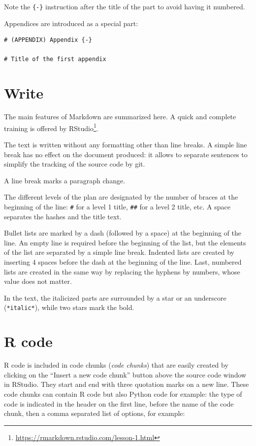 \documentclass[
  12pt,
  american,
  a4paper,
  extrafontsizes,onecolumn,openright
  ]{memoir}
\begin{document}
Note the \texttt{\{-\}} instruction after the title of the part to avoid having it numbered.

Appendices are introduced as a special part:

\begin{verbatim}
# (APPENDIX) Appendix {-} 

# Title of the first appendix
\end{verbatim}

\hypertarget{write}{%
\section{Write}\label{write}}

The main features of Markdown are summarized here.
A quick and complete training is offered by RStudio\footnote{\url{https://rmarkdown.rstudio.com/lesson-1.html}}.

The text is written without any formatting other than line breaks.
A simple line break has no effect on the document produced: it allows to separate sentences to simplify the tracking of the source code by git.

A line break marks a paragraph change.

The different levels of the plan are designated by the number of braces at the beginning of the line: \texttt{\#} for a level 1 title, \texttt{\#\#} for a level 2 title, etc.
A space separates the hashes and the title text.

Bullet lists are marked by a dash (followed by a space) at the beginning of the line.
An empty line is required before the beginning of the list, but the elements of the list are separated by a simple line break.
Indented lists are created by inserting 4 spaces before the dash at the beginning of the line.
Last, numbered lists are created in the same way by replacing the hyphens by numbers, whose value does not matter.

In the text, the italicized parts are surrounded by a star or an underscore (\texttt{*italic*}), while two stars mark the bold.

\hypertarget{r-code}{%
\section{R code}\label{r-code}}

R code is included in code chunks (\emph{code chunks}) that are easily created by clicking on the \enquote{Insert a new code chunk} button above the source code window in RStudio.
They start and end with three quotation marks on a new line.
These code chunks can contain R code but also Python code for example: the type of code is indicated in the header on the first line, before the name of the code chunk, then a comma separated list of options, for example:
\end{document}
